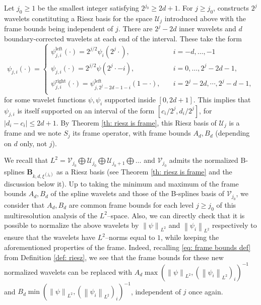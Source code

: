 \documentclass[preprint]{imsart}
\newcommand\norm[1]{\left\lVert#1\right\rVert}
\numberwithin{equation}{section}
\begin{document}
Let $j_0\geq1$ be the smallest integer satisfying $2^{j_0}\geq 2d+1$. For $j\geq j_0$, \cite{jia2006stable} constructs $2^j$ wavelets constituting a Riesz basis for the space $\mathcal{U}_j$ introduced above with the frame bounds being independent of $j$. There are $2^j-2d$ inner wavelets and $d$ boundary-corrected wavelets at each end of the interval. These take the form
\begin{equation}\label{eq: spline wavelets}
\psi_{j,i}(\cdot)=
\begin{cases}
    \psi_{j,i}^{\text{left}}(\cdot) =2^{j/2}\psi_i(2^j \cdot ), \quad &i=-d,\dots,-1\\
    \psi_{j,i}(\cdot) = 2^{j/2}\psi(2^j \cdot - i), \quad &i=0,\dots,2^j-2d-1, \\
    \psi_{j,i}^{\text{right}}(\cdot) =\psi_{j,2^j-2d-1-i}^{\text{left}}(1-\cdot), \quad & i=2^j-2d,\cdots,2^j-d-1,\\
\end{cases}
\end{equation}
for some wavelet functions $\psi, \psi_i$ supported inside $[0,2d+1]$. This implies that $\psi_{j,i}$ is itself supported on an interval of the form $[c_i/2^j,d_i/2^j]$, for $|d_i-c_i|\leq 2d+1$. By Theorem \ref{th: riesz is frame}, this Riesz basis of $\mathcal{U}_j$ is a frame and we note $S_j$ its frame operator, with frame bounds $A_d,B_d$ (depending on $d$ only, not $j$).

We recall that $L^2=\mathcal{V}_{j_0} \bigoplus \mathcal{U}_{j_0} \bigoplus \mathcal{U}_{j_0+1} \bigoplus \dots$ and $\mathcal{V}_{j_0}$ admits the normalized B-splines $\mathbf{B}_{k,d,\xi^{(j_0)}}$ as a Riesz basis (see Theorem \ref{th: riesz is frame} and the discussion below it). Up to taking the minimum and maximum of the frame bounds $A_d,B_d$ of the spline wavelets and those of the B-splines basis of $\mathcal{V}_{j_0}$, we consider that $A_d,B_d$ are common frame bounds for each level $j\geq j_0$ of this multiresolution analysis of the $L^2$--space. Also, we can directly check that it is possible to normalize the above wavelets by $\norm{\psi}_{L^2}$ and $\norm{\psi_i}_{L^2}$ respectively to ensure that the wavelets have $L^2$--norms equal to $1$, while keeping the aforementioned properties of the frame. Indeed, recalling \eqref{eq: frame bounds def} from Definition \ref{def: riesz}, we see that the frame bounds for these new normalized wavelets can be replaced with $A_d \max(\norm{\psi}_{L^2}, (\norm{\psi_i}_{L^2})_i)^{-1}$ and $B_d \min(\norm{\psi}_{L^2}, (\norm{\psi_i}_{L^2})_i)^{-1}$, independent of $j$ once again.
\end{document}
